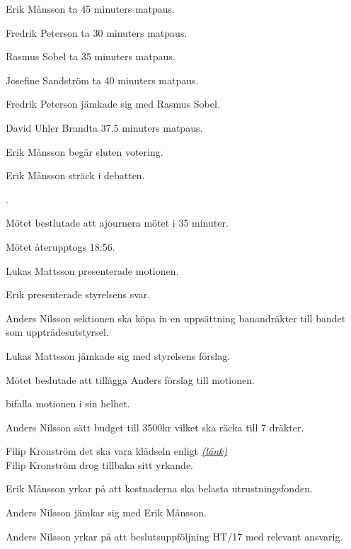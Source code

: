 \documentclass[10pt]{article}
\def\ji{David Uhler Brand}
\begin{document}
\begin{paragrafer}
\begin{paragrafer}
        Erik Månsson \ypa ta 45 minuters matpaus.

        Fredrik Peterson \ypa ta 30 minuters matpaus.

        Rasmus Sobel \ypa ta 35 minuters matpaus.

        Josefine Sandström \ypa ta 40 minuters matpaus.

        Fredrik Peterson jämkade sig med Rasmus Sobel.

        \ji  \ypa ta 37,5 minuters matpaus.

        Erik Månsson begär sluten votering.

        Erik Månsson \ypa sträck i debatten.

        \Mbaby.

        Mötet bestlutade att ajournera mötet i 35 minuter.

        Mötet återupptogs 18:56.
    \end{paragrafer}

        \begin{paragrafer}
          Lukas Mattsson presenterade motionen.

          Erik presenterade styrelsens svar.

          Anders Nilsson \ypa sektionen ska köpa in en uppsättning banandräkter till bandet som uppträdesutstyrsel.

          Lukas Mattsson jämkade sig med styrelsens förslag.

          Mötet beslutade att tillägga Anders förslag till motionen.

          \Mba bifalla motionen i sin helhet.

          Anders Nilsson \ypa sätt budget till 3500kr vilket ska räcka till 7 dräkter.

          Filip Kronström \ypa det ska vara klädseln enligt
          \href{http://www.ebay.com/itm/Willy-Adult-Unisex-Banana-Suits-Yellow-Costume-Light-Fruit-Party-Fancy-Dress-/152488835359?hash=item23810af91f:g:rA0AAOSwB-1Y2mCV}{\textit{(länk)}}\\

          Filip Kronström drog tillbaka sitt yrkande.

          Erik Månsson yrkar på att kostnaderna ska belasta utrustningsfonden.

          Anders Nilsson jämkar sig med Erik Månsson.

          Anders Nilsson yrkar på att beslutsuppföljning HT/17 med relevant ansvarig.


\end{paragrafer}
\end{paragrafer}
\end{document}
